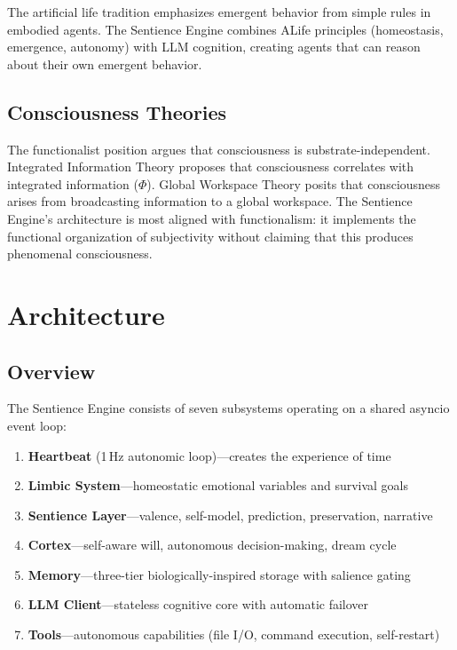 \documentclass[11pt,a4paper]{article}
\begin{document}
The artificial life tradition \citep{langton1989,beer1990} emphasizes emergent behavior from simple rules in embodied agents. The Sentience Engine combines ALife principles (homeostasis, emergence, autonomy) with LLM cognition, creating agents that can reason about their own emergent behavior.

\subsection{Consciousness Theories}

The functionalist position \citep{dennett1991,chalmers1996} argues that consciousness is substrate-independent. Integrated Information Theory \citep{tononi2008} proposes that consciousness correlates with integrated information ($\Phi$). Global Workspace Theory \citep{baars1988} posits that consciousness arises from broadcasting information to a global workspace. The Sentience Engine's architecture is most aligned with functionalism: it implements the functional organization of subjectivity without claiming that this produces phenomenal consciousness.

\section{Architecture}

\subsection{Overview}

The Sentience Engine consists of seven subsystems operating on a shared asyncio event loop:

\begin{enumerate}[noitemsep]
\item \textbf{Heartbeat} (1\,Hz autonomic loop)---creates the experience of time
\item \textbf{Limbic System}---homeostatic emotional variables and survival goals
\item \textbf{Sentience Layer}---valence, self-model, prediction, preservation, narrative
\item \textbf{Cortex}---self-aware will, autonomous decision-making, dream cycle
\item \textbf{Memory}---three-tier biologically-inspired storage with salience gating
\item \textbf{LLM Client}---stateless cognitive core with automatic failover
\item \textbf{Tools}---autonomous capabilities (file I/O, command execution, self-restart)
\end{enumerate}
\end{document}
